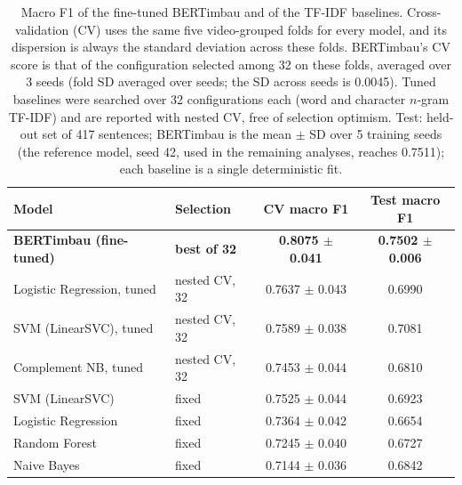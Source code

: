 \begin{table}[!t]
\centering
\caption{Macro F1 of the fine-tuned BERTimbau and of the TF-IDF baselines. Cross-validation (CV) uses the same five video-grouped folds for every model, and its dispersion is always the standard deviation across these folds. BERTimbau's CV score is that of the configuration selected among 32 on these folds, averaged over 3 seeds (fold SD averaged over seeds; the SD across seeds is 0.0045). Tuned baselines were searched over 32 configurations each (word and character $n$-gram TF-IDF) and are reported with nested CV, free of selection optimism. Test: held-out set of 417 sentences; BERTimbau is the mean $\pm$ SD over 5 training seeds (the reference model, seed 42, used in the remaining analyses, reaches 0.7511); each baseline is a single deterministic fit.}
\label{tab:baselines}
\begin{tabular}{llcc}
\toprule
Model & Selection & CV macro F1 & Test macro F1 \\
\midrule
\textbf{BERTimbau (fine-tuned)} & \textbf{best of 32} & \textbf{0.8075 $\pm$ 0.041} & \textbf{0.7502 $\pm$ 0.006} \\
\midrule
Logistic Regression, tuned & nested CV, 32 & 0.7637 $\pm$ 0.043 & 0.6990 \\
SVM (LinearSVC), tuned & nested CV, 32 & 0.7589 $\pm$ 0.038 & 0.7081 \\
Complement NB, tuned & nested CV, 32 & 0.7453 $\pm$ 0.044 & 0.6810 \\
\midrule
SVM (LinearSVC) & fixed & 0.7525 $\pm$ 0.044 & 0.6923 \\
Logistic Regression & fixed & 0.7364 $\pm$ 0.042 & 0.6654 \\
Random Forest & fixed & 0.7245 $\pm$ 0.040 & 0.6727 \\
Naive Bayes & fixed & 0.7144 $\pm$ 0.036 & 0.6842 \\
\bottomrule
\end{tabular}
\end{table}
